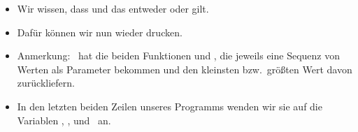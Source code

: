 \documentclass[aspectratio=169,mathserif,notheorems]{beamer}%
\begin{document}
\begin{frame}[t]
{{\begin{itemize}
{}%
\item<19-> Wir wissen, dass  und das entweder  oder  gilt.%
%
\item<20-> Dafür können wir nun wieder  drucken.%
%
\item<21-> Anmerkung: \python\ hat die beiden Funktionen  und , die jeweils eine Sequenz von Werten als Parameter bekommen und den kleinsten bzw.\ größten Wert davon zurückliefern.%
%
\item<22-> In den letzten beiden Zeilen unseres Programms wenden wir sie auf die Variablen , , und~ an.%
\end{itemize}%
}}%
%
%
%
\end{frame}%
%
\end{document}
